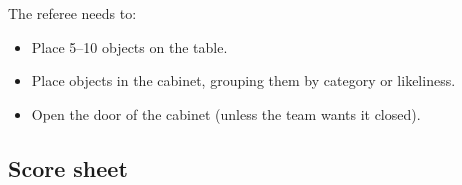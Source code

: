 The referee needs to:
\begin{itemize}
	\item Place 5--10 objects on the table.
	\item Place objects in the cabinet, grouping them by category or likeliness.
	\item Open the door of the cabinet (unless the team wants it closed).
\end{itemize}


\subsection*{Score sheet}


